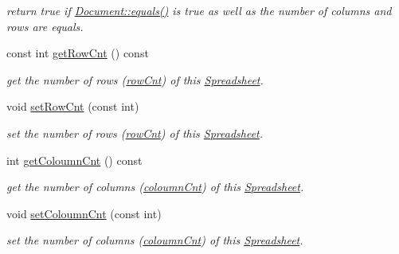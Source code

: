 \begin{DoxyCompactItemize}
\begin{DoxyCompactList}\small\item\em return true if \hyperlink{classdocs_1_1Document_ad86b3a7c7d496f3b05c740e2c1433c78}{Document\-::equals()} is true as well as the number of columns and rows are equals. \end{DoxyCompactList}\item 
\hypertarget{classdocs_1_1Spreadsheet_a25339a2bc1be68500a907969d15b02d0}{const int \hyperlink{classdocs_1_1Spreadsheet_a25339a2bc1be68500a907969d15b02d0}{get\-Row\-Cnt} () const }\label{classdocs_1_1Spreadsheet_a25339a2bc1be68500a907969d15b02d0}

\begin{DoxyCompactList}\small\item\em get the number of rows (\hyperlink{classdocs_1_1Spreadsheet_a69756007b1fbe6b45d2f052af930d748}{row\-Cnt}) of this \hyperlink{classdocs_1_1Spreadsheet}{Spreadsheet}. \end{DoxyCompactList}\item 
\hypertarget{classdocs_1_1Spreadsheet_a2178260b64460a010251eba24513bb9d}{void \hyperlink{classdocs_1_1Spreadsheet_a2178260b64460a010251eba24513bb9d}{set\-Row\-Cnt} (const int)}\label{classdocs_1_1Spreadsheet_a2178260b64460a010251eba24513bb9d}

\begin{DoxyCompactList}\small\item\em set the number of rows (\hyperlink{classdocs_1_1Spreadsheet_a69756007b1fbe6b45d2f052af930d748}{row\-Cnt}) of this \hyperlink{classdocs_1_1Spreadsheet}{Spreadsheet}. \end{DoxyCompactList}\item 
\hypertarget{classdocs_1_1Spreadsheet_a9a89463f0b79318f6ead47bb4d00a7b4}{int \hyperlink{classdocs_1_1Spreadsheet_a9a89463f0b79318f6ead47bb4d00a7b4}{get\-Coloumn\-Cnt} () const }\label{classdocs_1_1Spreadsheet_a9a89463f0b79318f6ead47bb4d00a7b4}

\begin{DoxyCompactList}\small\item\em get the number of columns (\hyperlink{classdocs_1_1Spreadsheet_a8193931da11e83c62b3aa1c2177e9e33}{coloumn\-Cnt}) of this \hyperlink{classdocs_1_1Spreadsheet}{Spreadsheet}. \end{DoxyCompactList}\item 
\hypertarget{classdocs_1_1Spreadsheet_a85e9d8dafdc6793560cb3f1cca41f8e2}{void \hyperlink{classdocs_1_1Spreadsheet_a85e9d8dafdc6793560cb3f1cca41f8e2}{set\-Coloumn\-Cnt} (const int)}\label{classdocs_1_1Spreadsheet_a85e9d8dafdc6793560cb3f1cca41f8e2}

\begin{DoxyCompactList}\small\item\em set the number of columns (\hyperlink{classdocs_1_1Spreadsheet_a8193931da11e83c62b3aa1c2177e9e33}{coloumn\-Cnt}) of this \hyperlink{classdocs_1_1Spreadsheet}{Spreadsheet}. \end{DoxyCompactList}\end{DoxyCompactItemize}
